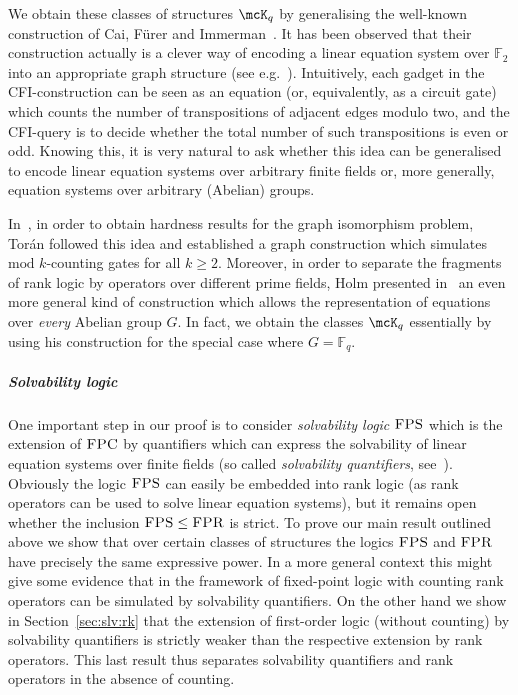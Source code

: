 \documentclass[a4paper,UKenglish]{lipics}
\newcommand{\modulo}{\ensuremath{\text{mod }}}
\newcommand{\field}[1]{\mathbb{#1}}
\newcommand{\logic}[1]{\ensuremath{\textsc{#1}}\xspace}
\newcommand{\FPC}{\logic{FPC}}
\newcommand{\FPRK}{\logic{FPR}}
\newcommand{\FPR}{\FPRK}
\newcommand{\FPS}{\ensuremath{\logic{FPS}}\xspace}
\theoremstyle{plain}
\begin{document}
\smallskip
We obtain these classes of structures $\mcK_q$ by generalising the 
well-known construction of Cai, Fürer and Immerman~\cite{CFI92}.
It has been observed that their construction actually is a clever way of 
encoding a linear equation system over $\field F_2$ into an appropriate graph 
structure (see e.g.\ \cite{AtBuDa09, DaGrHoLa09, Ho10, La11}).
Intuitively, each gadget in the CFI-construction can be seen as an 
equation (or, equivalently, as a circuit gate) which counts the number of 
transpositions of adjacent edges modulo two, and the CFI-query is to decide 
whether the total number of such transpositions is even or odd.
Knowing this, it is very natural to ask whether this idea can be generalised to 
encode linear equation systems over arbitrary finite fields or, more generally, 
equation systems over arbitrary (Abelian) groups.

In~\cite{To04}, in order to obtain hardness results for 
the graph isomorphism problem, Tor\'{a}n followed this idea and established a 
graph construction which simulates $\modulo k$-counting gates
for all $k \geq 2$. 
Moreover, in order to separate the fragments of rank logic by operators over 
different prime fields, Holm presented in~\cite{Ho10} an even more general kind 
of construction which allows the representation of equations over \emph{every} 
Abelian group $G$. In fact, we obtain the classes $\mcK_q$ essentially by 
using his construction for the special case where $G = \field F_q$.


\subparagraph*{Solvability logic}
One important step in our proof is to consider \emph{solvability 
logic} \FPS which is the extension of \FPC by quantifiers which can express the 
solvability of linear equation systems over finite fields (so called 
\emph{solvability quantifiers}, see~\cite{DaGrHoKoPa13, Pa10}). 
Obviously the logic $\FPS$ can easily be embedded into rank logic (as rank 
operators can be used to solve linear equation systems), but it remains open 
whether the inclusion $\FPS \leq \FPR$ is strict.
To prove our main result outlined above we show that over certain classes of 
structures the logics $\FPS$ and $\FPR$ have precisely the same expressive 
power. In a more general context this might give some evidence that in the 
framework of fixed-point logic with counting rank operators can be simulated by 
solvability quantifiers.
On the other hand we show in Section~\ref{sec:slv:rk} that the 
extension of first-order logic (without counting) by solvability quantifiers 
is strictly weaker than the respective extension by rank operators.
This last result thus separates solvability quantifiers and rank 
operators in  the absence of counting.
\end{document}
